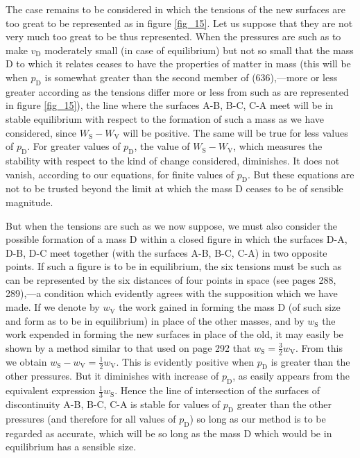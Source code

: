\documentclass[12pt]{memoir}
\begin{document}
The case remains to be considered in which the tensions of the new surfaces are too great to be represented as in figure \ref{fig_15}. Let us suppose that they are not very much too great to be thus represented. When the pressures are such as to make $v_\text{D}$ moderately small (in case of equilibrium) but not so small that the mass D to which it relates ceases to have the properties of matter in mass (this will be when $p_\text{D}$ is somewhat greater than the second member of (636),---more or less greater according as the tensions differ more or less from such as are represented in figure \ref{fig_15}), the line where the surfaces A-B, B-C, C-A meet will be in stable equilibrium with respect to the formation of such a mass as we have considered, since $W_\text{S}-W_\text{V}$ will be positive. The same will be true for less values of $p_\text{D}$. For greater values of $p_\text{D}$, the value of $W_\text{S}-W_\text{V}$, which measures the stability with respect to the kind of change considered, diminishes. It does not vanish, according to our equations, for finite values of $p_\text{D}$. But these equations are not to be trusted beyond the limit at which the mass D ceases to be of sensible magnitude.

But when the tensions are such as we now suppose, we must also consider the possible formation of a mass D within a closed figure in which the surfaces D-A, D-B, D-C meet together (with the surfaces A-B, B-C, C-A) in two opposite points. If such a figure is to be in equilibrium, the six tensions must be such as can be represented by the six distances of four points in space (see pages 288, 289),---a condition which evidently agrees with the supposition which we have made. If we denote by $w_\text{V}$ the work gained in forming the mass D (of such size and form as to be in equilibrium) in place of the other masses, and by $w_\text{S}$ the work expended in forming the new surfaces in place of the old, it may easily be shown by a method similar to that used on page 292 that $w_\text{S}=\tfrac{3}{2}w_\text{V}$. From  this we obtain $w_\text{S}-w_\text{V} = \tfrac{1}{2}w_\text{V}.$ This is evidently positive when $p_\text{D}$ is greater than the other pressures. But it diminishes with increase of $p_\text{D}$, as easily appears from the equivalent expression $\tfrac{1}{3}w_\text{S}$. Hence the line of intersection of the surfaces of discontinuity A-B, B-C, C-A is stable for values of $p_\text{D}$ greater than the other pressures (and therefore for all values of $p_\text{D}$) so long as our method is to be regarded as accurate, which will be so long as the mass D which would be in equilibrium has a sensible size.
\end{document}
